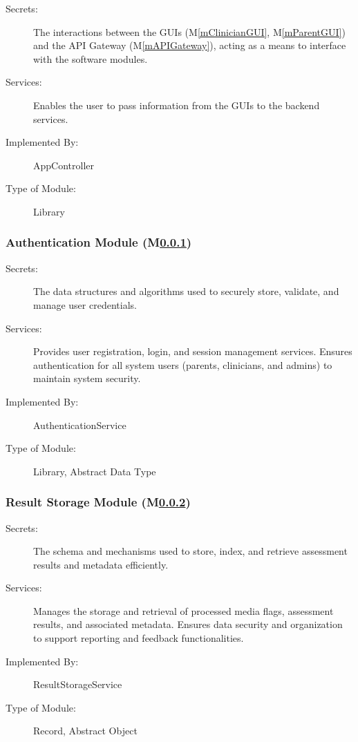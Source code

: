 \documentclass[12pt, titlepage]{article}
\newcounter{mnum}
\newcommand{\mref}[1]{M\ref{#1}}
\begin{document}
\begin{description}
  \item[Secrets:]The interactions between the GUIs (\mref{mClinicianGUI}, \mref{mParentGUI}) and the API Gateway (\mref{mAPIGateway}), acting as a means to interface with the software modules.
  \item[Services:]Enables the user to pass information from the GUIs to the backend services.
  \item[Implemented By:] AppController
  \item[Type of Module:] Library
  \end{description}


\subsubsection{Authentication Module (\mref{mAuth})}
\label{mAuth}

\begin{description}
\item[Secrets:] The data structures and algorithms used to securely store, validate, and manage user credentials.
\item[Services:] Provides user registration, login, and session management services. Ensures authentication for all system users (parents, clinicians, and admins) to maintain system security.
\item[Implemented By:] AuthenticationService
\item[Type of Module:] Library, Abstract Data Type
\end{description}

\subsubsection{Result Storage Module (\mref{mResultStorage})}
\label{mResultStorage}

\begin{description}
\item[Secrets:] The schema and mechanisms used to store, index, and retrieve assessment results and metadata efficiently.
\item[Services:] Manages the storage and retrieval of processed media flags, assessment results, and associated metadata. Ensures data security and organization to support reporting and feedback functionalities.
\item[Implemented By:] ResultStorageService
\item[Type of Module:] Record, Abstract Object
\end{description}
\end{document}
